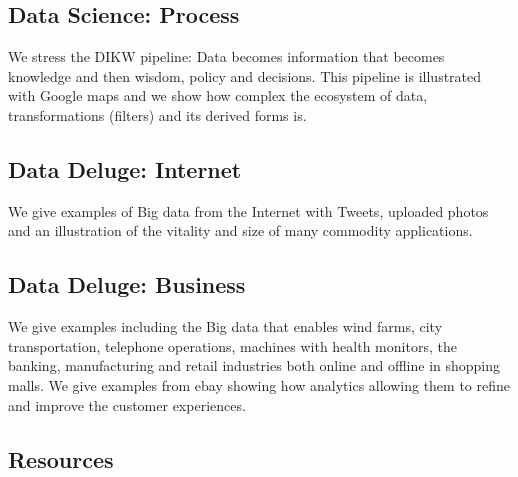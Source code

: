 
\subsection{Data Science: Process}\label{data-science-process}

We stress the DIKW pipeline: Data becomes information that becomes
knowledge and then wisdom, policy and decisions. This pipeline is
illustrated with Google maps and we show how complex the ecosystem of
data, transformations (filters) and its derived forms is.



\subsection{Data Deluge: Internet}\label{data-deluge-internet}

We give examples of Big data from the Internet with Tweets, uploaded
photos and an illustration of the vitality and size of many commodity
applications.



\subsection{Data Deluge: Business}\label{data-deluge-business}

We give examples including the Big data that enables wind farms, city
transportation, telephone operations, machines with health monitors, the
banking, manufacturing and retail industries both online and offline in
shopping malls. We give examples from ebay showing how analytics
allowing them to refine and improve the customer experiences.





\subsection{Resources}

